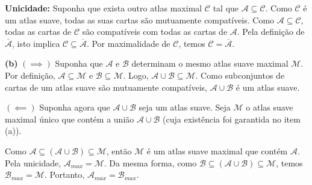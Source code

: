 {	\textbf{Unicidade:} Suponha que exista outro atlas maximal $\mathcal{C}$ tal que $\mathcal{A} \subseteq \mathcal{C}$. Como $\mathcal{C}$ é um atlas suave, todas as suas cartas são mutuamente compatíveis. Como $\mathcal{A} \subseteq \mathcal{C}$, todas as cartas de $\mathcal{C}$ são compatíveis com todas as cartas de $\mathcal{A}$. Pela definição de $\overline{\mathcal{A}}$, isto implica $\mathcal{C} \subseteq \overline{\mathcal{A}}$. Por maximalidade de $\mathcal{C}$, temos $\mathcal{C} = \overline{\mathcal{A}}$.
	
	\textbf{(b)} $(\implies)$ Suponha que $\mathcal{A}$ e $\mathcal{B}$ determinam o mesmo atlas suave maximal $\mathcal{M}$. Por definição, $\mathcal{A} \subseteq \mathcal{M}$ e $\mathcal{B} \subseteq \mathcal{M}$. Logo, $\mathcal{A} \cup \mathcal{B} \subseteq \mathcal{M}$. Como subconjuntos de cartas de um atlas suave são mutuamente compatíveis, $\mathcal{A} \cup \mathcal{B}$ é um atlas suave.
	
	$(\impliedby)$ Suponha agora que $\mathcal{A} \cup \mathcal{B}$ seja um atlas suave. Seja $\mathcal{M}$ o atlas suave maximal único que contém a união $\mathcal{A} \cup \mathcal{B}$ (cuja existência foi garantida no item (a)). 
	
	Como $\mathcal{A} \subseteq (\mathcal{A} \cup \mathcal{B}) \subseteq \mathcal{M}$, então $\mathcal{M}$ é um atlas suave maximal que contém $\mathcal{A}$. Pela unicidade, $\mathcal{A}_{max} = \mathcal{M}$. Da mesma forma, como $\mathcal{B} \subseteq (\mathcal{A} \cup \mathcal{B}) \subseteq \mathcal{M}$, temos $\mathcal{B}_{max} = \mathcal{M}$. Portanto, $\mathcal{A}_{max} = \mathcal{B}_{max}$.
}
